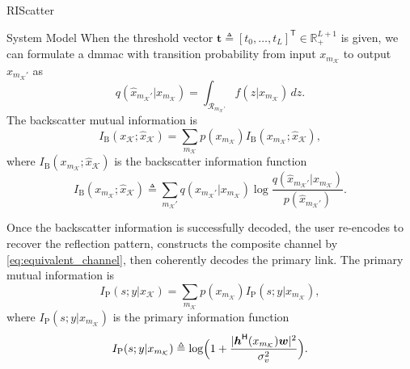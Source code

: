 \documentclass[journal]{IEEEtran}
\begin{document}
\begin{section}{RIScatter}
\begin{subsection}{System Model}
		When the threshold vector $\boldsymbol{t} \triangleq [t_0,\ldots,t_L]^\mathsf{T} \in \mathbb{R}_+^{L+1}$ is given, we can formulate a \gls{dmmac} with transition probability from input $x_{m_{\mathcal{K}}}$ to output $\hat{x}_{m_{\mathcal{K}}'}$ as
		\begin{equation}
			q(\hat{x}_{m_{\mathcal{K}}'}|x_{m_{\mathcal{K}}}) = \int_{\mathcal{R}_{m_{\mathcal{K}}'}} f(z|x_{m_{\mathcal{K}}}) \, d z.
			\label{eq:dmmac}
		\end{equation}
		The backscatter mutual information is
		\begin{equation}
			I_{\text{B}}(x_{\mathcal{K}};\hat{x}_{\mathcal{K}}) = \sum_{m_{\mathcal{K}}} p(x_{m_{\mathcal{K}}}) I_{\text{B}}(x_{m_{\mathcal{K}}};\hat{x}_{\mathcal{K}}),
			\label{eq:backscatter_mutual_information}
		\end{equation}
		where $I_{\text{B}}(x_{m_{\mathcal{K}}};\hat{x}_{\mathcal{K}})$ is the backscatter information function
		\begin{equation}
			I_{\text{B}}(x_{m_{\mathcal{K}}};\hat{x}_{\mathcal{K}}) \triangleq \sum_{m_{\mathcal{K}}'} q(\hat{x}_{m_{\mathcal{K}}'}|x_{m_{\mathcal{K}}}) \log \frac{q(\hat{x}_{m_{\mathcal{K}}'}|x_{m_{\mathcal{K}}})}{p(\hat{x}_{m_{\mathcal{K}}'})}.
			\label{eq:backscatter_information_function}
		\end{equation}

		Once the backscatter information is successfully decoded, the user re-encodes to recover the reflection pattern, constructs the composite channel by \eqref{eq:equivalent_channel}, then coherently decodes the primary link.
		The primary mutual information is
		\begin{equation}
			I_{\text{P}}(s;y|x_{\mathcal{K}}) = \sum_{m_{\mathcal{K}}} p(x_{m_{\mathcal{K}}}) I_{\text{P}}(s;y|x_{m_{\mathcal{K}}}),
			\label{eq:primary_mutual_information}
		\end{equation}
		where $I_{\text{P}}(s;y|x_{m_{\mathcal{K}}})$ is the primary information function
		\begin{equation}
			I_{\text{P}}(s;y|x_{m_{\mathcal{K}}}) \triangleq \log \Bigl(1 + \frac{\lvert \boldsymbol{h}^\mathsf{H}(x_{m_{\mathcal{K}}}) \boldsymbol{w} \rvert^2}{\sigma_v^2}\Bigr).
			\label{eq:primary_information_function}
		\end{equation}
	\end{subsection}
\end{section}
\end{document}
